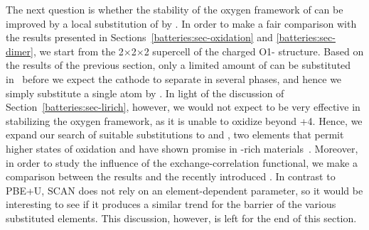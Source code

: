 \begin{refsection}
The next question is whether the stability of the oxygen framework of 
 can be improved by a local substitution of  by . In order 
to make a fair comparison with the results presented in 
Sections~\ref{batteries:sec-oxidation} and \ref{batteries:sec-dimer}, we start 
from the 2$\times$2$\times$2 supercell of the charged O1- structure. Based 
on the results of the previous section, only a limited amount of  can 
be substituted in~ before we expect the cathode to separate in several 
phases, and hence we simply substitute a single  atom by . In 
light of the discussion of Section~\ref{batteries:sec-lirich},  however, we 
would not expect  to be very effective in stabilizing the oxygen 
framework, as it is unable to oxidize beyond +4. Hence, we expand our search 
of suitable substitutions to  and , two elements that permit 
higher states of oxidation and have shown promise in -rich 
materials~\cite{Ma2014, Xiao2012}. Moreover, in order to study the influence of 
the exchange-correlation functional, we make a comparison between the  results and the 
recently introduced . 
In contrast to PBE+U, SCAN does not rely on an element-dependent parameter, 
so it would be interesting to see if it produces a similar trend for the 
barrier of the various substituted elements.
This discussion, however, is left for the end of this section.
 

\end{refsection}
